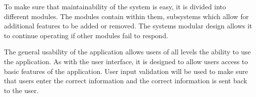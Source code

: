 \documentclass[12pt,a4paper]{article}
\begin{document}
To make sure that maintainability of the system is easy, it is divided into different modules. The modules contain within them, subsystems which allow for additional features to be added or removed. The systems modular design allows it to continue operating if other modules fail to respond. \newline

The general usability of the application allows users of all levels the ability to use the application. As with the user interface, it is designed to allow users access to basic features of the application. User input validation will be used to make sure that users enter the correct information and the correct information is sent back to the user. \newline	
\end{document}
